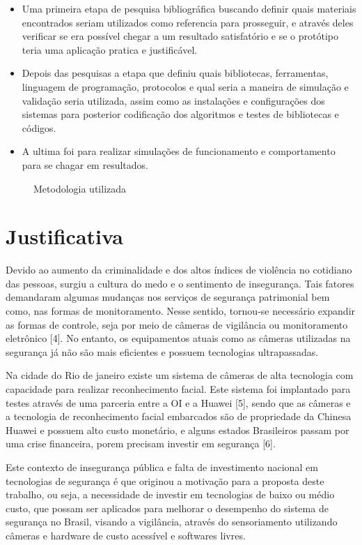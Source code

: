 \begin{itemize}
	\item Uma primeira etapa de pesquisa bibliográfica buscando definir quais materiais encontrados seriam utilizados como referencia para prosseguir, e através deles verificar se era possível chegar a um resultado satisfatório e se o protótipo teria uma aplicação pratica e justificável. 
	
	\item Depois das pesquisas a etapa que definiu quais bibliotecas, ferramentas, linguagem de programação, protocolos e qual seria a maneira de simulação e validação seria utilizada, assim como as instalações e configurações dos sistemas para posterior codificação dos algoritmos e testes de bibliotecas e códigos.
	
	\item A ultima foi para realizar simulações de funcionamento e comportamento para se chagar em resultados.
\end{itemize}

\begin{figure}[H]
	\centering	
	\caption{Metodologia utilizada}
	\fontsize{9pt}{12pt}\selectfont
	\def\svgwidth{16cm}
	
	\label{fig:diagmetpesq}
\end{figure}

\section{Justificativa} 
Devido ao aumento da criminalidade e dos altos índices de violência no cotidiano das pessoas, surgiu a cultura do medo e o sentimento de insegurança. Tais fatores demandaram algumas mudanças nos serviços de segurança patrimonial bem como, nas formas de monitoramento. Nesse sentido, tornou-se necessário expandir as formas de controle, seja por meio de câmeras de vigilância ou monitoramento eletrônico \cite{quatro}[4]. No entanto, os equipamentos atuais como as câmeras utilizadas na segurança já não são mais eficientes e possuem tecnologias ultrapassadas. 

Na cidade do Rio de janeiro existe um sistema de câmeras de alta tecnologia com capacidade para realizar reconhecimento facial. Este sistema foi implantado para testes através de uma parceria entre a OI e a Huawei \cite{cinco}[5], sendo que as câmeras e a tecnologia de reconhecimento facial embarcados são de propriedade da Chinesa Huawei e possuem alto custo monetário, e alguns estados Brasileiros passam por uma crise financeira, porem precisam investir em segurança \cite{seis}[6].

Este contexto de insegurança pública e falta de investimento nacional em tecnologias de segurança é que originou a motivação para a proposta deste trabalho, ou seja, a necessidade de investir em tecnologias de baixo ou médio custo, que possam ser aplicados para melhorar o desempenho do sistema de segurança no Brasil, visando a vigilância, através do sensoriamento utilizando câmeras e hardware de custo acessível e softwares livres.



